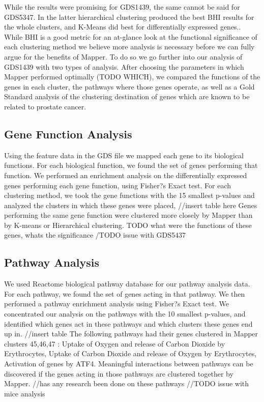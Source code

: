 \documentclass[preprint,10pt]{elsarticle}
\begin{document}




While the results were promising for GDS1439, the same cannot be said for GDS5347. In the latter hierarchical clustering produced the best BHI results for the whole clusters, and K-Means did best for differentially expressed genes.. While BHI is a good metric for an at-glance look at the functional significance of each clustering method we believe more analysis is necessary before we can fully argue for the benefits of Mapper. To do so we go further into our analysis of GDS1439 with two types of analysis. After choosing the parameters in which Mapper performed optimally (TODO WHICH), we compared the functions of the genes in each cluster, the pathways where those genes operate, as well as a Gold Standard analysis of the clustering destination of genes which are known to be related to prostate cancer. 



\subsection{Gene Function Analysis}
Using the feature data in the GDS file we mapped each gene to its biological functions. For each biological function, we found the set of genes performing that function. We performed an enrichment analysis on the differentially expressed genes performing each gene function, using Fisher?s Exact test. For each clustering method, we took the gene functions with the 15 smallest p-values and analyzed the clusters in which these genes were placed,
//insert table here
Genes performing the same gene function were clustered more closely by Mapper than by K-means or Hierarchical clustering. TODO what were the functions of these genes, whats the significance
/TODO issue with GDS5437

\subsection{Pathway Analysis}
	We used Reactome biological pathway database for our pathway analysis data. For each pathway, we found the set of genes acting in that pathway. We then performed a pathway enrichment analysis using Fisher?s Exact test. We concentrated our analysis on the pathways with the 10 smallest p-values, and identified which genes act in these pathways and which clusters these genes end up in.
//insert table
The following pathways had their genes clustered in Mapper clusters 45,46,47 : Uptake of Oxygen and release of Carbon Dioxide by Erythrocytes, Uptake of Carbon Dioxide and release of Oxygen by Erythrocytes, Activation of genes by ATF4. Meaningful interactions between pathways can be discovered if the genes acting in those pathways are clustered together by Mapper.
//has any research been done on these pathways
//TODO issue with mice analysis
\end{document}
